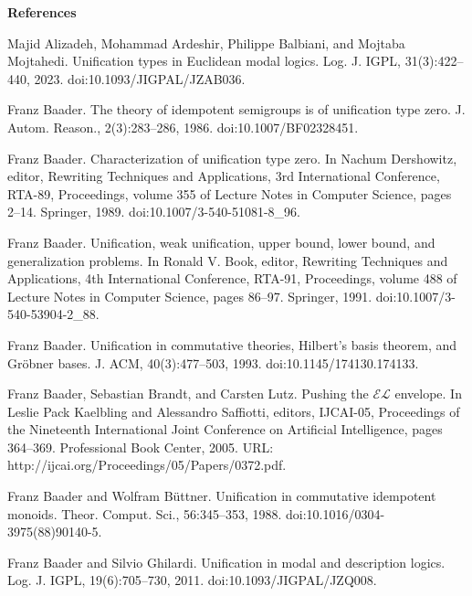 
 
\par\medskip\noindent\textbf{References}\par
  
\par\noindent  [1]  Majid Alizadeh, Mohammad Ardeshir, Philippe Balbiani, and Mojtaba Mojtahedi.  Unification types in Euclidean modal logics.  Log. J. IGPL, 31(3):422–440, 2023.  doi:10.1093/JIGPAL/JZAB036.  
 
\par\noindent  [2]  Franz Baader.  The theory of idempotent semigroups is of unification type zero.  J. Autom. Reason., 2(3):283–286, 1986.  doi:10.1007/BF02328451.  
 
\par\noindent  [3]  Franz Baader.  Characterization of unification type zero.  In Nachum Dershowitz, editor, Rewriting Techniques and Applications, 3rd International Conference, RTA-89, Proceedings, volume 355 of Lecture Notes in Computer Science, pages 2–14. Springer, 1989.  doi:10.1007/3-540-51081-8\_96.  
 
\par\noindent  [4]  Franz Baader.  Unification, weak unification, upper bound, lower bound, and generalization problems.  In Ronald V. Book, editor, Rewriting Techniques and Applications, 4th International Conference, RTA-91, Proceedings, volume 488 of Lecture Notes in Computer Science, pages 86–97. Springer, 1991.  doi:10.1007/3-540-53904-2\_88.  
 
\par\noindent  [5]  Franz Baader.  Unification in commutative theories, Hilbert’s basis theorem, and Gröbner bases.  J. ACM, 40(3):477–503, 1993.  doi:10.1145/174130.174133.  
 
\par\noindent  [6]  Franz Baader, Sebastian Brandt, and Carsten Lutz.  Pushing the $\mathcal{EL}$ envelope.  In Leslie Pack Kaelbling and Alessandro Saffiotti, editors, IJCAI-05, Proceedings of the Nineteenth International Joint Conference on Artificial Intelligence, pages 364–369. Professional Book Center, 2005.  URL: http://ijcai.org/Proceedings/05/Papers/0372.pdf.  
 
\par\noindent  [7]  Franz Baader and Wolfram Büttner.  Unification in commutative idempotent monoids.  Theor. Comput. Sci., 56:345–353, 1988.  doi:10.1016/0304-3975(88)90140-5.  
 
\par\noindent  [8]  Franz Baader and Silvio Ghilardi.  Unification in modal and description logics.  Log. J. IGPL, 19(6):705–730, 2011.  doi:10.1093/JIGPAL/JZQ008.  
 
